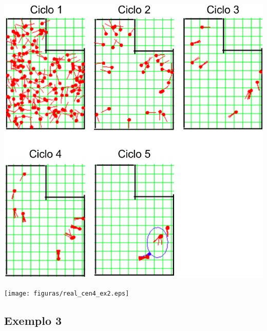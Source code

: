 {\centering
\includegraphics[scale=0.4]{figuras/cen4_ex2.eps}
\label{img:cen4_ex2}
\par}

{\centering
\texttt{[image: figuras/real\_cen4\_ex2.eps]}
\label{img:real_cen4_ex2}
\par}

\subsection{Exemplo 3}

